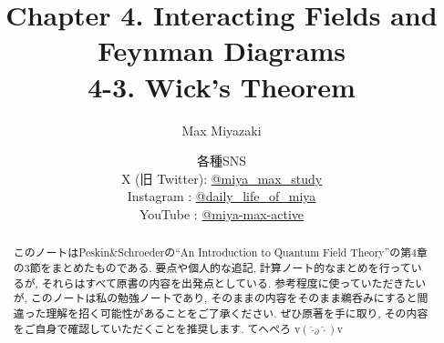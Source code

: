 \documentclass[a4paper,12pt]{article}
\title{Chapter 4. Interacting Fields and Feynman Diagrams\\
4-3. Wick's Theorem}
\date{各種SNS\\
    X (旧 Twitter): \href{https://x.com/miya_max_study}{@miya\_max\_study}\\
    Instagram : \href{https://www.instagram.com/daily_life_of_miya/}{@daily\_life\_of\_miya}\\
    YouTube : \href{https://www.youtube.com/@miya-max-active}{@miya-max-active}
    }
\author{Max Miyazaki}
\begin{document}
\maketitle

\vspace{1cm}
\begin{abstract}
    このノートはPeskin\&Schroederの``An Introduction to Quantum Field Theory''の第4章の3節をまとめたものである. 要点や個人的な追記, 計算ノート的なまとめを行っているが, それらはすべて原書の内容を出発点としている. 参考程度に使っていただきたいが, このノートは私の勉強ノートであり, そのままの内容をそのまま鵜呑みにすると間違った理解を招く可能性があることをご了承ください. ぜひ原著を手に取り, その内容をご自身で確認していただくことを推奨します. てへぺろ v$({\hat{\cdot}_\partial \hat{\cdot}})$v
\end{abstract}
    
    

\newpage
\color{blue}
\end{document}
